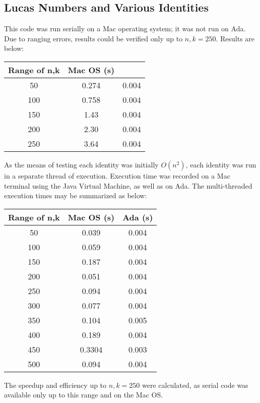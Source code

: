 \documentclass[11pt]{article}
\begin{document}
\subsection{Lucas Numbers and Various Identities}
This code was run serially on a Mac operating system; it was not run on Ada. Due to ranging errors, results could be verified only up to $n,k=250$. Results are below:
\vspace{.1in}

\begin{center}
\begin{tabular}{ccc}
\hline
 Range of n,k & Mac OS (s)  \\ \hline
50 & 0.274 & 0.004\\
100 & 0.758 & 0.004 \\
150 & 1.43 & 0.004 \\
200 & 2.30 & 0.004 \\
250 & 3.64 & 0.004 \\ 
\hline \hline
\end{tabular}
\end{center}

As the means of testing each identity was initially $O(n^{2})$, each identity was run in a separate thread of execution. Execution time was recorded on a Mac terminal using the Java Virtual Machine, as well as on Ada. The multi-threaded execution times may be summarized as below:

\begin{center}
\begin{tabular}{ccc}
\hline
 Range of n,k & Mac OS (s) & Ada (s) \\ \hline
50 & 0.039 & 0.004\\
100 & 0.059 & 0.004 \\
150 & 0.187 & 0.004 \\
200 & 0.051 & 0.004 \\
250 & 0.094 & 0.004 \\ 
300 & 0.077 & 0.004 \\
350 & 0.104 & 0.005 \\
400 & 0.189 & 0.004 \\
450 & 0.3304 & 0.003 \\
500 & 0.094 &0.004 \\ \hline \hline
\end{tabular}
\end{center}

The speedup and efficiency up to $n,k=250$ were calculated, as serial code was available only up to this range and on the Mac OS.
\vspace{.1in}
\end{document}
